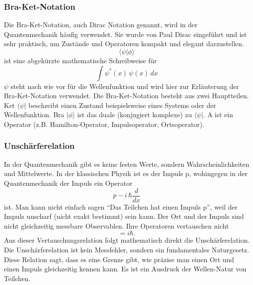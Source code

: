 \subsubsection{Bra-Ket-Notation\label{fourier:subsubsection:BraKetNotation}}
Die Bra-Ket-Notation, auch Dirac Notation genannt, wird in der Quantenmechanik häufig verwendet.
Sie wurde von Paul Dirac eingeführt und ist sehr praktisch, um Zustände und Operatoren kompakt und elegant darzustellen.
\begin{equation}
	\langle \psi | \phi \rangle
\end{equation}
ist eine abgekürzte mathematische Schreibweise für
\begin{equation}
	\int \psi^*(x)\,\psi(x)\,dx
\end{equation}
$\psi$ steht nach wie vor für die Wellenfunktion und wird hier zur Erläuterung der Bra-Ket-Notation verwendet.
Die Bra-Ket-Notation besteht aus zwei Hauptteilen.
Ket $\langle \psi |$ beschreibt einen Zustand beispielsweise eines Systems oder der Wellenfunktion.
Bra $| \phi \rangle$ ist das duale (konjugiert komplexe) zu $\langle \psi |$.
A ist ein Operator (z.B. Hamilton-Operator, Impulsoperator, Ortsoperator).

\subsubsection{Unschärferelation\label{fourier:subsubsection:Unschaerferelation}}
In der Quantenmechanik gibt es keine festen Werte, sondern Wahrscheinlichkeiten und Mittelwerte.
In der klassischen Physik ist es der Impuls p, wohingegen in der Quantenmechanik der Impuls ein Operator 
\begin{equation}
	p - i \, \hbar \frac{d}{dx}
\end{equation}
ist.
Man kann nicht einfach sagen ``Das Teilchen hat einen Impuls p'', weil der Impuls unscharf (nicht exakt bestimmt) sein kann.
Der Ort und der Impuls sind nicht gleichzeitig messbare Observablen.
Ihre Operatoren vertauschen nicht
\begin{equation}
    [\hat{x}, \hat{p}] = i\hbar.
\end{equation}
Aus dieser Vertauschungsrelation folgt mathematisch direkt die Unschärferelation.
Die Unschärferelation ist kein Messfehler, sondern ein fundamentales Naturgesetz.
Diese Relation sagt, dass es eine Grenze gibt, wie präzise man einen Ort und einen Impuls gleichzeitig kennen kann.
Es ist ein Ausdruck der Wellen-Natur von Teilchen.

